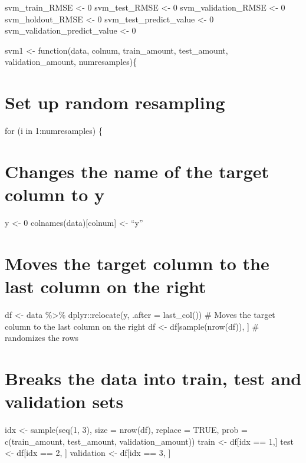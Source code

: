 \documentclass[
]{book}
\begin{document}
svm\_train\_RMSE \textless- 0 svm\_test\_RMSE \textless- 0 svm\_validation\_RMSE \textless- 0
svm\_holdout\_RMSE \textless- 0 svm\_test\_predict\_value \textless- 0
svm\_validation\_predict\_value \textless- 0

svm1 \textless- function(data, colnum, train\_amount, test\_amount,
validation\_amount, numresamples)\{

\chapter{Set up random resampling}\label{set-up-random-resampling-15}

for (i in 1:numresamples) \{

\chapter{Changes the name of the target column to y}\label{changes-the-name-of-the-target-column-to-y-15}

y \textless- 0 colnames(data){[}colnum{]} \textless- ``y''

\chapter{Moves the target column to the last column on the right}\label{moves-the-target-column-to-the-last-column-on-the-right-15}

df \textless- data \%\textgreater\% dplyr::relocate(y, .after = last\_col()) \# Moves the
target column to the last column on the right df \textless-
df{[}sample(nrow(df)), {]} \# randomizes the rows

\chapter{Breaks the data into train, test and validation sets}\label{breaks-the-data-into-train-test-and-validation-sets-15}

idx \textless- sample(seq(1, 3), size = nrow(df), replace = TRUE, prob =
c(train\_amount, test\_amount, validation\_amount)) train \textless- df{[}idx == 1,{]} test \textless- df{[}idx == 2, {]} validation \textless- df{[}idx == 3, {]}
\end{document}
